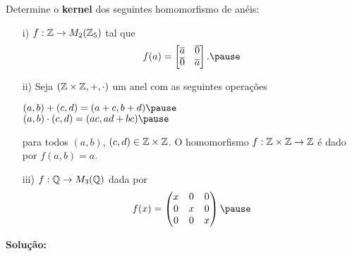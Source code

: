 \documentclass{beamer}
\begin{document}
    \begin{frame}
        \begin{exemplos}
            Determine o \textbf{kernel} dos seguintes homomorfismo de an\'eis:
            \begin{enumerate}
                \item[i)] $f : \mathbb{Z} \to M_2(\mathbb{Z}_5)$ \pause tal que\pause
                \[
                    f(a) = \begin{bmatrix}
                        \overline{a} & \overline{0}\\
                        \overline{0} & \overline{a}
                    \end{bmatrix}.\pause
                \]

                \item[ii)] Seja $(\mathbb{Z}\times\mathbb{Z}, +, \cdot)$ \pause um anel com as seguintes opera\c{c}\~oes\pause
                \begin{center}
                    $(a, b) + (c, d) = (a + c, b + d)\pause$\\
                    $(a, b)\cdot (c, d) = (ac, ad + bc)\pause$
                \end{center}
                para todos $(a, b)$, $(c, d) \in \mathbb{Z}\times\mathbb{Z}$. \pause
                O homomorfismo $ f : \mathbb{Z} \times \mathbb{Z} \to \mathbb{Z}$ \'e dado por $f(a, b) = a$.
            \end{enumerate}
        \end{exemplos}
    \end{frame}

    \begin{frame}
        \begin{exemplos}
            \begin{enumerate}
                \item[iii)] $f : \mathbb{Q} \to M_3(\mathbb{Q})$ \pause dada por\pause
                \[
                    f(x) = \begin{pmatrix}
                        x & 0 & 0\\
                        0 & x & 0\\
                        0 & 0 & x
                    \end{pmatrix}\pause
                \]
            \end{enumerate}
        \end{exemplos}

        \noindent \textbf{Solu\c{c}\~ao:}
        \vspace{3cm}
    \end{frame}
\end{document}
